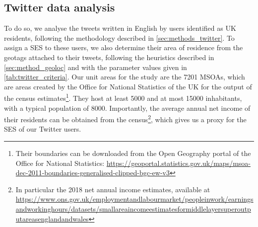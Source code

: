 \documentclass[../thesis.tex]{subfiles}
\begin{document}
\subsection{Twitter data analysis}
To do so, we analyse the tweets written in English by users identified as UK residents,
following the methodology described in \cref{sec:methods_twitter}. To assign a \ac{SES}
to these users, we also determine their area of residence from the geotags attached to
their tweets, following the heuristics described in \cref{sec:method_geoloc} and with the parameter values given in \cref{tab:twitter_criteria}.
Our unit areas for the study are the \SI{7201}{} \acp{MSOA}, which are
areas created by the Office for National Statistics of the UK for the output of the
census estimates\footnote{Their boundaries can be downloaded from the Open Geography
portal of the Office for National Statistics:
\url{https://geoportal.statistics.gov.uk/maps/msoa-dec-2011-boundaries-generalised-clipped-bgc-ew-v3}}.
They host at least \SI{5000}{} and at most \SI{15000}{} inhabitants, with a typical
population of \SI{8000}{}. Importantly, the average annual net income of their
residents can be obtained from the census\footnote{In particular the 2018 net annual
income estimates, available at
\url{https://www.ons.gov.uk/employmentandlabourmarket/peopleinwork/earningsandworkinghours/datasets/smallareaincomeestimatesformiddlelayersuperoutputareasenglandandwales}},
which gives us a proxy for the \ac{SES} of our Twitter users.
\end{document}
